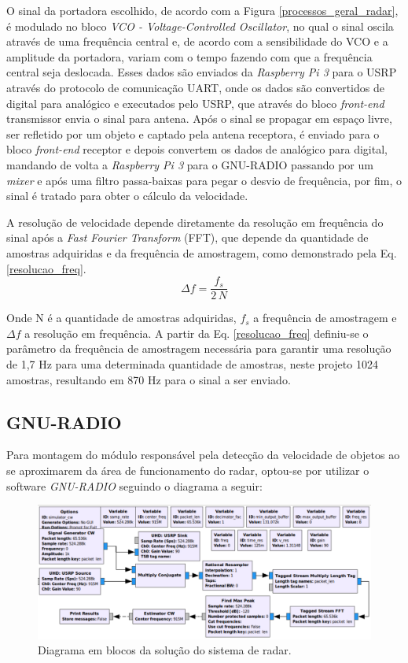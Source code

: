 O sinal da portadora escolhido, de acordo com a Figura \ref{processos_geral_radar}, é modulado no bloco \emph{VCO - Voltage-Controlled Oscillator}, no qual o sinal oscila através de uma frequência central e, de acordo com a sensibilidade do VCO e a amplitude da portadora, variam com o tempo fazendo com que a frequência central seja deslocada. Esses dados são enviados da \emph{Raspberry Pi 3} para o USRP através do protocolo de comunicação UART, onde os dados são convertidos de digital para analógico e executados pelo USRP, que através do bloco \emph{front-end} transmissor envia o sinal para antena. Após o sinal se propagar em espaço livre, ser refletido por um objeto e captado pela antena receptora,  é enviado para o bloco \emph{front-end} receptor e depois convertem os dados de analógico para digital, mandando de volta a \emph{Raspberry Pi 3} para o GNU-RADIO passando por um \emph{mixer} e após uma filtro passa-baixas para pegar o desvio de frequência, por fim, o sinal é tratado para obter o cálculo da velocidade.



A resolução de velocidade depende diretamente da resolução em frequência do sinal após a \emph{Fast Fourier Transform} (FFT), que depende da quantidade de amostras adquiridas e da frequência de amostragem, como demonstrado pela Eq. \ref{resolucao_freq}.
\begin{equation}\label{resolucao_freq}
    \Delta f = \frac{f_{s}}{2\,N}
\end{equation}

Onde N é a quantidade de amostras adquiridas, $f_{s}$ a frequência de amostragem e $\Delta f$ a resolução em frequência. A partir da Eq. \ref{resolucao_freq} definiu-se o parâmetro da frequência de amostragem necessária para garantir uma resolução de 1,7 Hz para uma determinada quantidade de amostras, neste projeto 1024 amostras, resultando em 870 Hz para o sinal a ser enviado.

\subsection{GNU-RADIO}

    Para montagem do módulo responsável pela detecção da velocidade de objetos ao se aproximarem da área de funcionamento do radar, optou-se por utilizar o software \emph{GNU-RADIO} seguindo o diagrama a seguir:

\begin{figure}[H]
    \centering
    \includegraphics[scale=0.4]{figuras/GNUR.png}
    \caption{Diagrama em blocos da solução do sistema de radar.}
    \label{GNU}
\end{figure}

